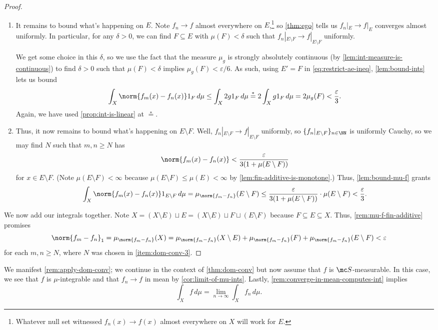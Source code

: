 \documentclass[../notes.tex]{subfiles}
\begin{document}
\begin{proof}
\begin{enumerate}
		\item It remains to bound what's happening on $E$. Note $f_n\to f$ almost everywhere on $E$,\footnote{Whatever null set witnessed $f_n(x)\to f(x)$ almost everywhere on $X$ will work for $E$.} so \autoref{thm:ego} tells us $f_n|_E\to f|_E$ converges almost uniformly. In particular, for any $\delta>0$, we can find $F\subseteq E$ with $\mu(F)<\delta$ such that $f_n|_{E\setminus F}\to f|_{E\setminus F}$ uniformly.
	
		We get some choice in this $\delta$, so we use the fact that the measure $\mu_g$ is strongly absolutely continuous (by \autoref{lem:int-measure-is-continuous}) to find $\delta>0$ such that $\mu(F)<\delta$ implies $\mu_g(F)<\varepsilon/6$. As such, using $E'=F$ in \autoref{eq:restrict-ae-ineq}, \autoref{lem:bound-ints} lets us bound
		\[\int_X\norm{f_m(x)-f_n(x)}1_F\,d\mu\le\int_X2g1_F\,d\mu\stackrel*=2\int_Xg1_F\,d\mu=2\mu_g(F)<\frac\varepsilon3.\]
		Again, we have used \autoref{prop:int-is-linear} at $\stackrel*=$.
		
		\item \label{item:dom-conv-3} Thus, it now remains to bound what's happening on $E\setminus F$. Well, $f_n|_{E\setminus F}\to f|_{E\setminus F}$ uniformly, so $\{f_n|_{E\setminus F}\}_{n\in\NN}$ is uniformly Cauchy, so we may find $N$ such that $m,n\ge N$ has
		\[\norm{f_m(x)-f_n(x)}<\frac\varepsilon{3(1+\mu(E\setminus F))}\]
		for $x\in E\setminus F$. (Note $\mu(E\setminus F)<\infty$ because $\mu(E\setminus F)\le\mu(E)<\infty$ by \autoref{lem:fin-additive-is-monotone}.) Thus, \autoref{lem:bound-mu-f} grants
		\[\int_X\norm{f_m(x)-f_n(x)}1_{E\setminus F}\,d\mu=\mu_{\norm{f_m-f_n}}(E\setminus F)\le\frac\varepsilon{3(1+\mu(E\setminus F))}\cdot\mu(E\setminus F)<\frac\varepsilon3.\]
	\end{enumerate}
	We now add our integrals together. Note $X=(X\setminus E)\sqcup E=(X\setminus E)\sqcup F\sqcup(E\setminus F)$ because $F\subseteq E\subseteq X$. Thus, \autoref{rem:mu-f-fin-additive} promises
	\[\norm{f_m-f_n}_1=\mu_{\norm{f_m-f_n}}(X)=\mu_{\norm{f_m-f_n}}(X\setminus E)+\mu_{\norm{f_m-f_n}}(F)+\mu_{\norm{f_m-f_n}}(E\setminus F)<\varepsilon\]
	for each $m,n\ge N$, where $N$ was chosen in \autoref{item:dom-conv-3}.
\end{proof}
\begin{remark}
	We manifest \autoref{rem:apply-dom-conv}; we continue in the context of \autoref{thm:dom-conv} but now assume that $f$ is $\mc S$-measurable. In this case, we see that $f$ is $\mu$-integrable and that $f_n\to f$ in mean by \autoref{cor:limit-of-mu-ints}. Lastly, \autoref{rem:converge-in-mean-computes-int} implies
	\[\int_Xf\,d\mu=\lim_{n\to\infty}\int_Xf_n\,d\mu.\]
\end{remark}
\end{document}

